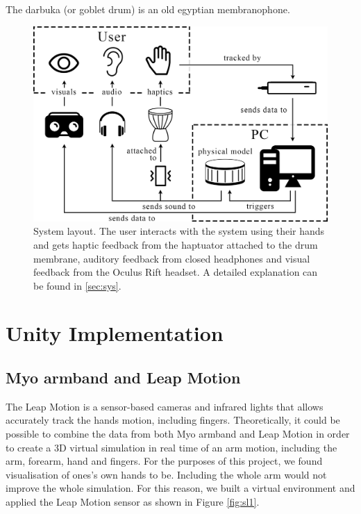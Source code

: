 \documentclass{vgtc}
\begin{document}
The darbuka (or goblet drum) is an old egyptian membranophone.


\begin{figure}[h]
\includegraphics[width=1.0\columnwidth]{systemlayout-updated.png}
\caption{System layout. The user interacts with the system using their hands and gets haptic feedback from the haptuator attached to the drum membrane, auditory feedback from closed headphones and visual feedback from the Oculus Rift headset. A detailed explanation can be found in \autoref{sec:sys}.}
\centering
\label{fig:systemLayout}
\end{figure}


\section{Unity Implementation}\label{sec:unity}
\subsection{Myo armband and Leap Motion}
The Leap Motion is a sensor-based cameras and infrared lights that allows accurately track the hands motion, including ﬁngers. Theoretically, it could be possible to combine the data from both Myo armband and Leap Motion in order to create a 3D virtual simulation in real time of an arm motion, including the arm, forearm, hand and fingers. For the purposes of this project, we found visualisation of ones's own hands to be. Including the whole arm would not improve the whole simulation. For this reason, we built a virtual environment and applied the Leap Motion sensor as shown in Figure \ref{fig:sl1}.
\end{document}
